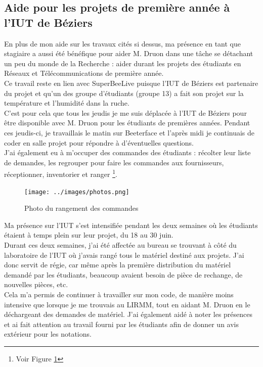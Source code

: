 \documentclass[11pt,french,a4paper]{report}
\begin{document}
        \subsection{Aide pour les projets de première année à l'IUT de Béziers}
En plus de mon aide sur les travaux cités si dessus, ma présence en tant que stagiaire a aussi été bénéfique pour aider M. Druon 
dans une tâche se détachant un peu du monde de la Recherche : aider durant les projets des étudiants en Réseaux et Télécommunications 
de première année. \\
Ce travail reste en lien avec SuperBeeLive puisque l'IUT de Béziers est partenaire du projet et qu'un des groupe d'étudiants (groupe 13) 
a fait son projet sur la température et l'humidité dans la ruche. \\
C'est pour cela que tous les jeudis je me suis déplacée à l'IUT de Béziers pour être disponible avec M. Druon pour les étudiants de premières
années.
Pendant ces jeudis-ci, je travaillais le matin sur Beeterface et 
l'après midi je continuais de coder en salle projet pour répondre à d'éventuelles questions. \\
J'ai également eu à m'occuper des commandes des étudiants : récolter leur liste de demandes, les regrouper pour faire les commandes
aux fournisseurs, réceptionner, inventorier et ranger \footnote{Voir Figure \ref{photo_bureau}}.\\
\begin{figure}
    \centering
    \texttt{[image: ../images/photos.png]}
    \caption{Photo du rangement des commandes}
    \label{photo_bureau}
\end{figure}
    

Ma présence sur l'IUT s'est intensifiée pendant les deux semaines où les étudiants étaient à temps plein sur leur projet, du 18 au 30 juin. \\
Durant ces deux semaines, j'ai été affectée au bureau se trouvant à côté du laboratoire de l'IUT où j'avais rangé tous le matériel 
destiné aux projets.
J'ai donc servit de régie, car même après la première distribution du matériel demandé par les étudiants, beaucoup avaient 
besoin de pièce de rechange, de nouvelles pièces, etc. \\
Cela m'a permis de continuer à travailler sur mon code, de manière moins intensive que lorsque je me trouvais au LIRMM, tout en
aidant M. Druon en le déchargeant des demandes de matériel. 
J'ai également aidé à noter les présences et ai fait attention au travail fourni par les étudiants afin de donner un avis extérieur pour
les notations.
\end{document}
